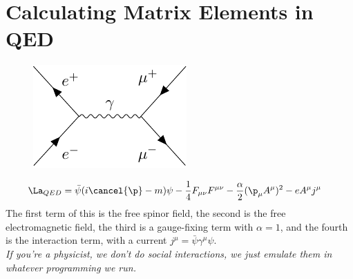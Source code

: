 \documentclass[a4paper, 11pt, normalem]{report}
\begin{document}
\chapter{Calculating Matrix Elements in QED}
\begin{figure}[H]
    \centering
    \includegraphics{etomu.pdf}
    \vspace{-30pt}
\end{figure}
\begin{align}
    \La_{QED} &= \bar{\psi}(i\cancel{\p}-m)\psi - \frac14F_{\mu\nu}F^{\mu\nu} - \frac{\alpha}{2}(\p_\mu A^\mu)^2 - eA^\mu j^\mu
\end{align}
The first term of this is the free spinor field, the second is the free electromagnetic field, the third is a gauge-fixing term with $\alpha=1$, and the fourth is the interaction term, with a current $j^\mu = \bar{\psi}\gamma^\mu\psi$.\\
\textit{If you're a physicist, we don't do social interactions, we just emulate them in whatever programming we run.}
\end{document}
